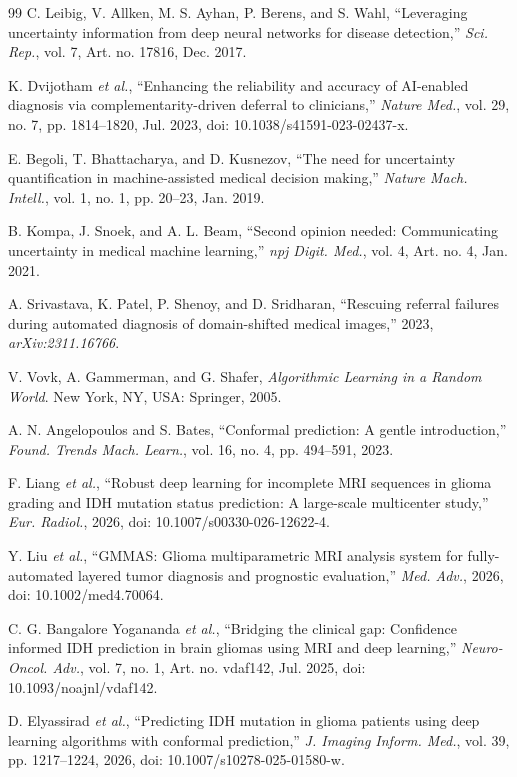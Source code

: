 \documentclass[journal]{IEEEtran}
\begin{document}
\begin{thebibliography}{99}
 C. Leibig, V. Allken, M. S. Ayhan, P. Berens, and S. Wahl, ``Leveraging uncertainty information from deep neural networks for disease detection,'' \emph{Sci. Rep.}, vol. 7, Art. no. 17816, Dec. 2017.

 K. Dvijotham \emph{et al.}, ``Enhancing the reliability and accuracy of AI-enabled diagnosis via complementarity-driven deferral to clinicians,'' \emph{Nature Med.}, vol. 29, no. 7, pp. 1814--1820, Jul. 2023, doi: 10.1038/s41591-023-02437-x.

 E. Begoli, T. Bhattacharya, and D. Kusnezov, ``The need for uncertainty quantification in machine-assisted medical decision making,'' \emph{Nature Mach. Intell.}, vol. 1, no. 1, pp. 20--23, Jan. 2019.

 B. Kompa, J. Snoek, and A. L. Beam, ``Second opinion needed: Communicating uncertainty in medical machine learning,'' \emph{npj Digit. Med.}, vol. 4, Art. no. 4, Jan. 2021.

 A. Srivastava, K. Patel, P. Shenoy, and D. Sridharan, ``Rescuing referral failures during automated diagnosis of domain-shifted medical images,'' 2023, \emph{arXiv:2311.16766}.

 V. Vovk, A. Gammerman, and G. Shafer, \emph{Algorithmic Learning in a Random World}. New York, NY, USA: Springer, 2005.

 A. N. Angelopoulos and S. Bates, ``Conformal prediction: A gentle introduction,'' \emph{Found. Trends Mach. Learn.}, vol. 16, no. 4, pp. 494--591, 2023.

 F. Liang \emph{et al.}, ``Robust deep learning for incomplete MRI sequences in glioma grading and IDH mutation status prediction: A large-scale multicenter study,'' \emph{Eur. Radiol.}, 2026, doi: 10.1007/s00330-026-12622-4.

 Y. Liu \emph{et al.}, ``GMMAS: Glioma multiparametric MRI analysis system for fully-automated layered tumor diagnosis and prognostic evaluation,'' \emph{Med. Adv.}, 2026, doi: 10.1002/med4.70064.

 C. G. Bangalore Yogananda \emph{et al.}, ``Bridging the clinical gap: Confidence informed IDH prediction in brain gliomas using MRI and deep learning,'' \emph{Neuro-Oncol. Adv.}, vol. 7, no. 1, Art. no. vdaf142, Jul. 2025, doi: 10.1093/noajnl/vdaf142.

 D. Elyassirad \emph{et al.}, ``Predicting IDH mutation in glioma patients using deep learning algorithms with conformal prediction,'' \emph{J. Imaging Inform. Med.}, vol. 39, pp. 1217--1224, 2026, doi: 10.1007/s10278-025-01580-w.


\end{thebibliography}
\end{document}
